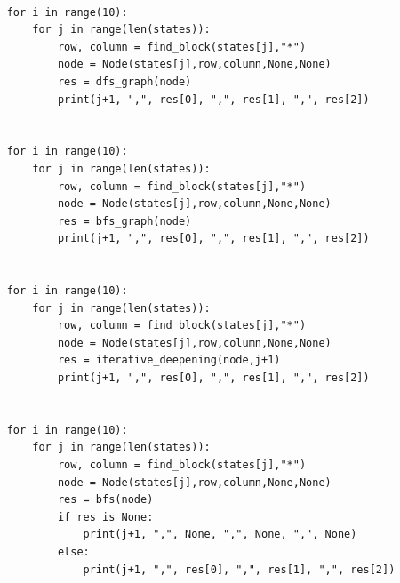 \documentclass[10pt]{article}
\begin{document}
\begin{lstlisting}
    
    for i in range(10):
        for j in range(len(states)):
            row, column = find_block(states[j],"*")
            node = Node(states[j],row,column,None,None)
            res = dfs_graph(node)
            print(j+1, ",", res[0], ",", res[1], ",", res[2])
    
    
    for i in range(10):
        for j in range(len(states)):
            row, column = find_block(states[j],"*")
            node = Node(states[j],row,column,None,None)
            res = bfs_graph(node)
            print(j+1, ",", res[0], ",", res[1], ",", res[2])
    
    
    for i in range(10):
        for j in range(len(states)):
            row, column = find_block(states[j],"*")
            node = Node(states[j],row,column,None,None)
            res = iterative_deepening(node,j+1)
            print(j+1, ",", res[0], ",", res[1], ",", res[2])
    
    
    for i in range(10):
        for j in range(len(states)):
            row, column = find_block(states[j],"*")
            node = Node(states[j],row,column,None,None)
            res = bfs(node)
            if res is None:
                print(j+1, ",", None, ",", None, ",", None)
            else:
                print(j+1, ",", res[0], ",", res[1], ",", res[2])
    
  \end{lstlisting}
\end{document}
